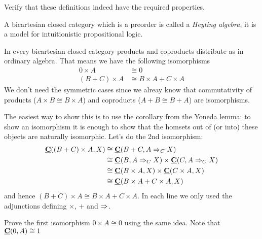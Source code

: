 \begin{Exercise}
Verify that these definitions indeed have the required properties.
\end{Exercise}
A bicartesian closed category which is a preorder is called a \emph{Heyting algebra}, it is a model for intuitionistic propositional logic.


In every bicartesian closed category products and coproducts distribute as in ordinary algebra. That means we have the following isomorphisms
\begin{align*}
  0 \times A & \cong 0 \\
  (B + C)\times A & \cong B\times A + C \times A
\end{align*}
We don't need the symmetric cases since we alreay know that commutativity of products ($A \times B \cong B \times A$) and coproducts ($A + B \cong B + A$) are isomorphisms.

The easiest way to show this is to use the corollary from the Yoneda lemma: to show an isomorphism it is enough to show that the homsets out of (or into) these objects are naturally isomorphic. Let's do the 2nd isomorphism: 
\begin{align*}
  \homC{C}{(B + C)\times A}{X} 
   & \cong \homC{C}{B+C}{\expC{C}{A}{X}} \\
  & \cong \homC{C}{B}{\expC{C}{A}{X}} \times \homC{C}{C}{\expC{C}{A}{X}} \\
   & \cong \homC{C}{B\times A}{X} \times \homC{C}{C\times A}{X} \\
   & \cong \homC{C}{B \times A + C \times A}{X}
\end{align*}
and hence $(B + C)\times A \cong B\times A + C \times A$.
In each line we only used the adjunctions defining $\times$, $+$ and $\expC{}{}{}$.
\begin{Exercise}
  Prove the first isomorphism $0 \times A \cong 0$ using the same idea. Note that $\homC{C}{0}{A} \cong 1$
\end{Exercise}

